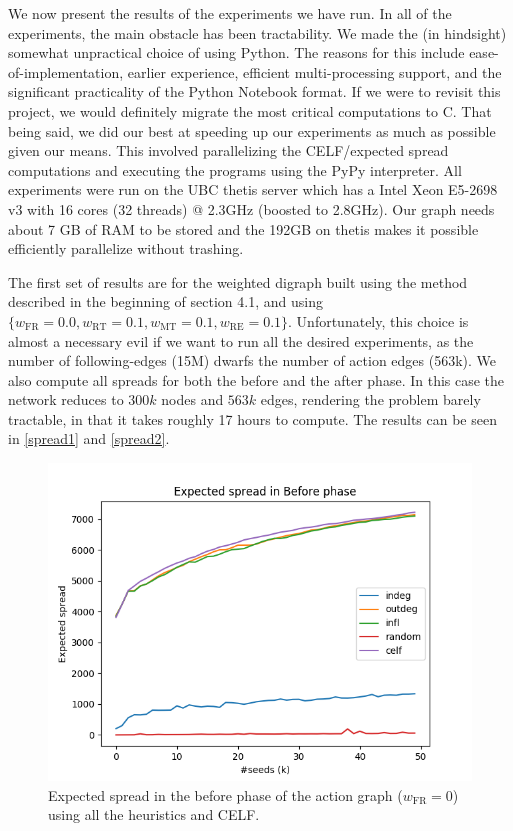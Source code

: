 \documentclass[sigconf]{acmart}
\begin{document}
We now present the results of the experiments we have run. In all of the experiments, the main obstacle has been tractability. We made the (in hindsight) somewhat unpractical choice of using Python. The reasons for this include ease-of-implementation, earlier experience, efficient multi-processing support, and the significant practicality of the Python Notebook format. If we were to revisit this project, we would definitely migrate the most critical computations to C. That being said, we did our best at speeding up our experiments as much as possible given our means. This involved parallelizing the CELF/expected spread computations and executing the programs using the PyPy interpreter. All experiments were run on the UBC thetis server which has a Intel Xeon E5-2698 v3 with 16 cores (32 threads) @ 2.3GHz (boosted to 2.8GHz). Our graph needs about 7 GB of RAM to be stored and the 192GB on thetis makes it possible efficiently parallelize without trashing.

The first set of results are for the weighted digraph built using the method described in the beginning of section 4.1, and using $\{w_{\text{FR}} = 0.0, w_{\text{RT}} = 0.1, w_{\text{MT}} = 0.1, w_{\text{RE}} = 0.1\}$. Unfortunately, this choice is almost a necessary evil if we want to run all the desired experiments, as the number of following-edges (15M) dwarfs the number of action edges (563k). We also compute all spreads for both the before and the after phase. In this case the network reduces to $300k$ nodes and $563k$ edges, rendering the problem barely tractable, in that it takes roughly 17 hours to compute. The results can be seen in \autoref{spread1} and \autoref{spread2}.

\begin{figure}[htbp]
\begin{center}
\includegraphics[width=0.9\linewidth]{Figures/period1.png}
\caption{Expected spread in the before phase of the action graph ($w_{\text{FR}} = 0$) using all the heuristics and CELF.}
\label{spread1}
\end{center}
\end{figure}
\end{document}
